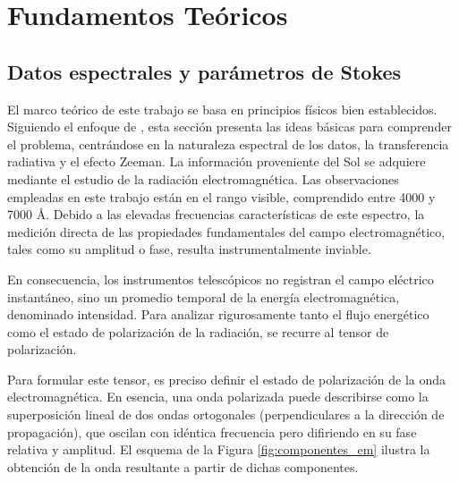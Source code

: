 
\newpage
\section{Fundamentos Teóricos}
\subsection{Datos espectrales y parámetros de Stokes}
El marco teórico de este trabajo se basa en principios físicos bien establecidos. Siguiendo el enfoque de \cite{toroiniestaIntroductionSpectropolarimetry2003}, esta sección presenta las ideas básicas para comprender el problema, centrándose en la naturaleza espectral de los datos, la transferencia radiativa y el efecto Zeeman.
La información proveniente del Sol se adquiere mediante el estudio de la radiación electromagnética. Las observaciones empleadas en este trabajo están en el rango visible, comprendido entre 4000 y 7000 \AA. Debido a las elevadas frecuencias características de este espectro, la medición directa de las propiedades fundamentales del campo electromagnético, tales como su amplitud o fase, resulta instrumentalmente inviable.

En consecuencia, los instrumentos telescópicos no registran el campo eléctrico instantáneo, sino un promedio temporal de la energía electromagnética, denominado intensidad. Para analizar rigurosamente tanto el flujo energético como el estado de polarización de la radiación, se recurre al tensor de polarización.

Para formular este tensor, es preciso definir el estado de polarización de la onda electromagnética. En esencia, una onda polarizada puede describirse como la superposición lineal de dos ondas ortogonales (perpendiculares a la dirección de propagación), que oscilan con idéntica frecuencia pero difiriendo en su fase relativa y amplitud. El esquema de la Figura \ref{fig:componentes_em} ilustra la obtención de la onda resultante a partir de dichas componentes.

